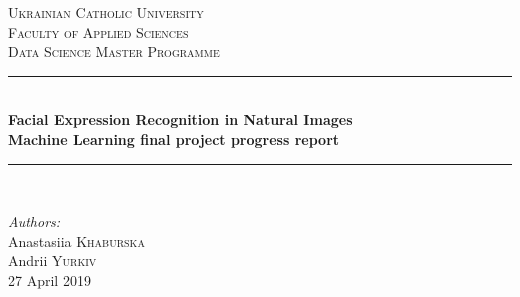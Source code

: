 \begin{titlepage}

\newcommand{\HRule}{\rule{\linewidth}{0.5mm}} %

\center %
 

\textsc{\LARGE Ukrainian Catholic University}\\[1cm] %
\textsc{\Large  Faculty of Applied Sciences}\\[0.5cm] %
\textsc{\large Data Science Master Programme}\\[0.5cm] %

\vspace*{1cm}

\HRule \\[0.4cm]
{ \huge \bfseries Facial Expression Recognition in Natural Images}\\[10pt]
{\Large \bfseries Machine Learning final project progress report}\\[0.4cm] %
\HRule \\[1cm]
 
\vspace*{1cm}

\Large \emph{Authors:}\\
Anastasiia \textsc{Khaburska}\\Andrii \textsc{Yurkiv}\\[1cm] %

\vspace*{1cm}
{\large 27 April 2019}\\[2cm] %


\end{titlepage}
